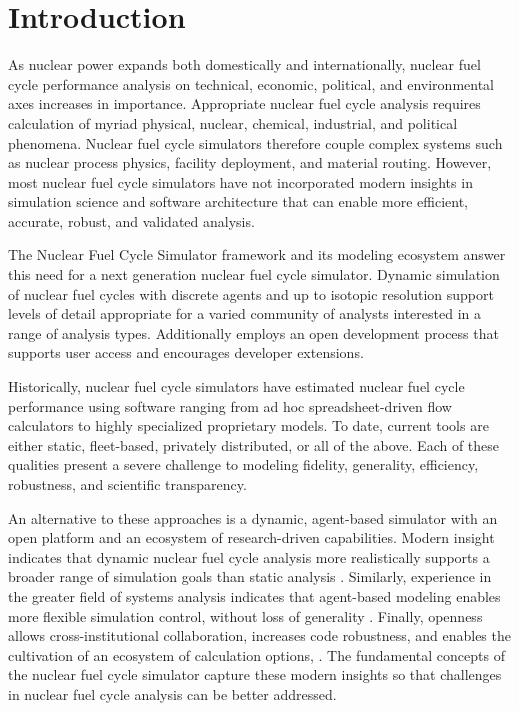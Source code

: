 
\section{Introduction}



As nuclear power expands both domestically and internationally, nuclear fuel cycle
performance analysis on technical, economic, political, and environmental axes increases 
in importance. Appropriate nuclear fuel cycle analysis requires calculation of myriad physical, nuclear, 
chemical, industrial, and political phenomena. Nuclear fuel cycle simulators 
therefore couple complex systems such as nuclear process physics, 
facility deployment, and material routing. However, most nuclear fuel cycle 
simulators have not incorporated modern insights in simulation science and 
software architecture that can enable more efficient, accurate, robust, and 
validated analysis. 

The \Cyclus Nuclear Fuel Cycle Simulator framework and 
its modeling ecosystem answer this need for a next generation nuclear fuel cycle 
simulator. Dynamic simulation of nuclear fuel cycles with discrete agents 
and up to isotopic resolution support 
levels of detail appropriate for a varied community of analysts
interested in a range of analysis types. Additionally \Cyclus employs an 
open development process that supports user access and 
encourages developer extensions.

Historically, nuclear fuel cycle simulators have estimated 
nuclear fuel cycle performance using software 
ranging from ad hoc spreadsheet-driven flow calculators to highly specialized 
proprietary models. To date, current tools are either static, fleet-based, 
privately distributed, or all of the above. Each of these qualities present a 
severe challenge to modeling fidelity, generality, efficiency, robustness, and 
scientific transparency. 

An alternative to these approaches is a dynamic, agent-based simulator with an 
open platform and an ecosystem of research-driven capabilities.  Modern 
insight indicates that dynamic nuclear fuel cycle analysis more realistically 
supports a broader range of simulation goals than static analysis 
\cite{piet_dynamic_2011}. Similarly, experience in the greater field of systems 
analysis indicates that agent-based modeling enables more flexible simulation 
control, without loss of generality \cite{thatpapermattsent}. Finally, openness 
allows cross-institutional collaboration, increases code robustness, and 
enables the cultivation of an ecosystem of calculation options, 
\cite{softwarecarpentryresource}.  The fundamental concepts of the \Cyclus 
nuclear fuel cycle simulator capture these modern insights so that challenges 
in nuclear fuel cycle analysis can be better addressed. 

